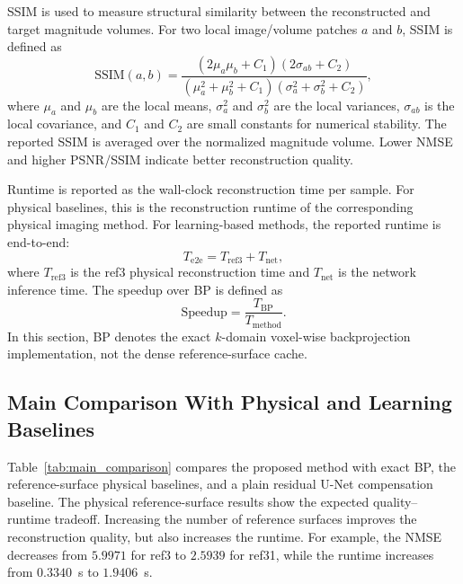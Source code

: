 \documentclass[journal]{IEEEtran}
\begin{document}
SSIM is used to measure structural similarity between the reconstructed and target magnitude volumes. For two local image/volume patches $a$ and $b$, SSIM is defined as
\begin{equation}
\mathrm{SSIM}(a,b)
=
\frac{(2\mu_a\mu_b+C_1)(2\sigma_{ab}+C_2)}
{(\mu_a^2+\mu_b^2+C_1)(\sigma_a^2+\sigma_b^2+C_2)},
\label{eq:ssim_metric}
\end{equation}
where $\mu_a$ and $\mu_b$ are the local means, $\sigma_a^2$ and $\sigma_b^2$ are the local variances, $\sigma_{ab}$ is the local covariance, and $C_1$ and $C_2$ are small constants for numerical stability. The reported SSIM is averaged over the normalized magnitude volume. Lower NMSE and higher PSNR/SSIM indicate better reconstruction quality.

Runtime is reported as the wall-clock reconstruction time per sample. For physical baselines, this is the reconstruction runtime of the corresponding physical imaging method. For learning-based methods, the reported runtime is end-to-end:
\begin{equation}
T_{\mathrm{e2e}}=T_{\mathrm{ref3}}+T_{\mathrm{net}},
\end{equation}
where $T_{\mathrm{ref3}}$ is the ref3 physical reconstruction time and $T_{\mathrm{net}}$ is the network inference time. The speedup over BP is defined as
\begin{equation}
\mathrm{Speedup}=\frac{T_{\mathrm{BP}}}{T_{\mathrm{method}}}.
\end{equation}
In this section, BP denotes the exact $k$-domain voxel-wise backprojection implementation, not the dense reference-surface cache.

\subsection{Main Comparison With Physical and Learning Baselines}
\label{subsec:main_comparison}

Table~\ref{tab:main_comparison} compares the proposed method with exact BP, the reference-surface physical baselines, and a plain residual U-Net compensation baseline. The physical reference-surface results show the expected quality--runtime tradeoff. Increasing the number of reference surfaces improves the reconstruction quality, but also increases the runtime. For example, the NMSE decreases from $5.9971$ for ref3 to $2.5939$ for ref31, while the runtime increases from $0.3340$~s to $1.9406$~s.
\end{document}
